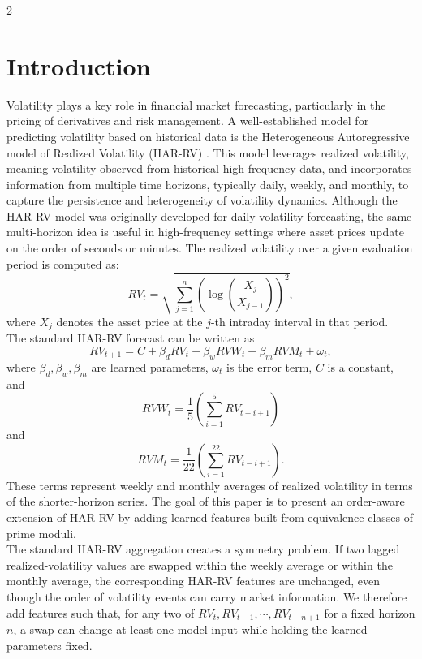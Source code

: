 \documentclass[a4paper]{article}
\begin{document}
\begin{multicols}{2}
\setlength{\columnsep}{0.5cm}

\section{Introduction}
\vspace{0.3cm}
\noindent
Volatility plays a key role in financial market forecasting, particularly in the pricing of derivatives and risk management. A well-established model for predicting volatility based on historical data is the Heterogeneous Autoregressive model of Realized Volatility (HAR-RV) \cite{corsi2009}. This model leverages realized volatility, meaning volatility observed from historical high-frequency data, and incorporates information from multiple time horizons, typically daily, weekly, and monthly, to capture the persistence and heterogeneity of volatility dynamics. Although the HAR-RV model was originally developed for daily volatility forecasting, the same multi-horizon idea is useful in high-frequency settings where asset prices update on the order of seconds or minutes. The realized volatility over a given evaluation period is computed as:
\[
RV_t = \sqrt{\sum_{j=1}^n \left(\log\left(\frac{X_j}{X_{j-1}}\right)\right)^2},
\]
where $X_j$ denotes the asset price at the $j$-th intraday interval in that period.
\vspace{0.3cm}
\\ The standard HAR-RV forecast can be written as $$RV_{t+1} = C + \beta_d RV_t + \beta_wRVW_t + \beta_m RVM_t + \overline{\omega}_t,$$ where $\beta_d, \beta_w, \beta_m$ are learned parameters, $\overline{\omega}_t$ is the error term, $C$ is a constant, and $$RVW_t = \frac15\left(\sum_{i=1}^5 RV_{t-i+1}\right)$$ and $$RVM_t = \frac1{22}\left(\sum_{i=1}^{22} RV_{t-i+1}\right).$$ These terms represent weekly and monthly averages of realized volatility in terms of the shorter-horizon series. The goal of this paper is to present an order-aware extension of HAR-RV by adding learned features built from equivalence classes of prime moduli.
\vspace{0.3cm}
\\ The standard HAR-RV aggregation creates a symmetry problem. If two lagged realized-volatility values are swapped within the weekly average or within the monthly average, the corresponding HAR-RV features are unchanged, even though the order of volatility events can carry market information. We therefore add features such that, for any two of $RV_t, RV_{t-1}, \cdots, RV_{t-n+1}$ for a fixed horizon $n$, a swap can change at least one model input while holding the learned parameters fixed.

\end{multicols}
\end{document}
